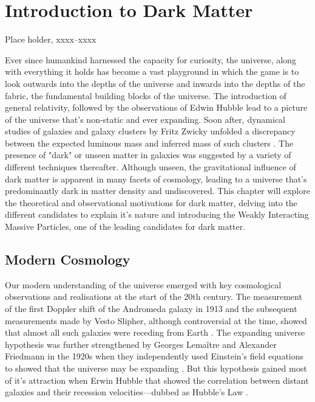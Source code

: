 \chapter{Introduction to Dark Matter}
\label{chap:chap1}


%
{Place holder, xxxx--xxxx}%

Ever since humankind harnessed the capacity for curiosity, the universe, along with everything it holds has become a vast playground in which the game is to look outwards into the depths of the universe and inwards into the depths of the fabric, the fundamental building blocks of the universe. The introduction of general relativity, followed by the observations of Edwin Hubble lead to a picture of the universe that's non-static and ever expanding. Soon after, dynamical studies of galaxies and galaxy clusters by Fritz Zwicky unfolded a discrepancy between the expected luminous mass and inferred mass of such clusters \cite{Fritz_Zwicky_1993}. The presence of "dark" or unseen matter in galaxies was suggested by a variety of different techniques thereafter. Although unseen, the gravitational influence of dark matter is apparent in many facets of cosmology, leading to a universe that's predominantly dark in matter density and undiscovered. This chapter will explore the theoretical and observational motivations for dark matter, delving into the different candidates to explain it's nature and introducing the Weakly Interacting Massive Particles, one of the leading candidates for dark matter. 

\newpage

\section{Modern Cosmology}
\label{sec:moderncosmology}

Our modern understanding of the universe emerged with key cosmological observations and realisations at the start of the 20th century. The measurement of the first Doppler shift of the Andromeda galaxy in 1913 and the subsequent measurements made by Vesto Slipher, although controversial at the time, showed that almost all such galaxies were receding from Earth \cite{Slipler}. The expanding universe hypothesis was further strengthened by Georges Lemaître and Alexander Friedmann in the 1920s when they independently used Einstein's field equations to showed that the universe may be expanding \cite{Friedman}. But this hypothesis gained most of it's attraction when Erwin Hubble that showed the correlation between distant galaxies and their recession velocities---dubbed as Hubble's Law \cite{Hubble}.


